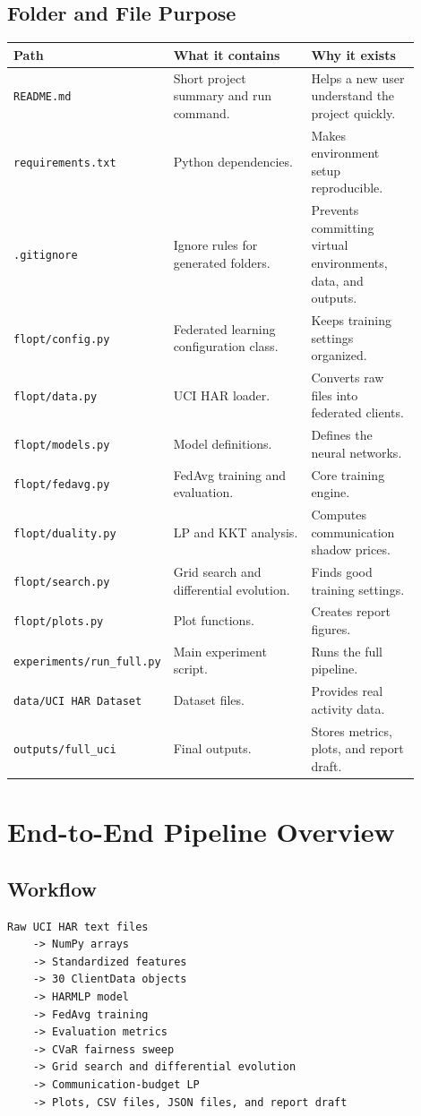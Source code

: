 \documentclass{article}
\begin{document}
\subsection{Folder and File Purpose}
\begin{longtable}{p{0.28\linewidth}p{0.35\linewidth}p{0.27\linewidth}}
\toprule
Path & What it contains & Why it exists \\
\midrule
\texttt{README.md} & Short project summary and run command. & Helps a new user understand the project quickly. \\
\texttt{requirements.txt} & Python dependencies. & Makes environment setup reproducible. \\
\texttt{.gitignore} & Ignore rules for generated folders. & Prevents committing virtual environments, data, and outputs. \\
\texttt{flopt/config.py} & Federated learning configuration class. & Keeps training settings organized. \\
\texttt{flopt/data.py} & UCI HAR loader. & Converts raw files into federated clients. \\
\texttt{flopt/models.py} & Model definitions. & Defines the neural networks. \\
\texttt{flopt/fedavg.py} & FedAvg training and evaluation. & Core training engine. \\
\texttt{flopt/duality.py} & LP and KKT analysis. & Computes communication shadow prices. \\
\texttt{flopt/search.py} & Grid search and differential evolution. & Finds good training settings. \\
\texttt{flopt/plots.py} & Plot functions. & Creates report figures. \\
\texttt{experiments/run\_full.py} & Main experiment script. & Runs the full pipeline. \\
\texttt{data/UCI HAR Dataset} & Dataset files. & Provides real activity data. \\
\texttt{outputs/full\_uci} & Final outputs. & Stores metrics, plots, and report draft. \\
\bottomrule
\end{longtable}

\section{End-to-End Pipeline Overview}

\subsection{Workflow}
\begin{lstlisting}[style=textstyle]
Raw UCI HAR text files
    -> NumPy arrays
    -> Standardized features
    -> 30 ClientData objects
    -> HARMLP model
    -> FedAvg training
    -> Evaluation metrics
    -> CVaR fairness sweep
    -> Grid search and differential evolution
    -> Communication-budget LP
    -> Plots, CSV files, JSON files, and report draft
\end{lstlisting}
\end{document}
